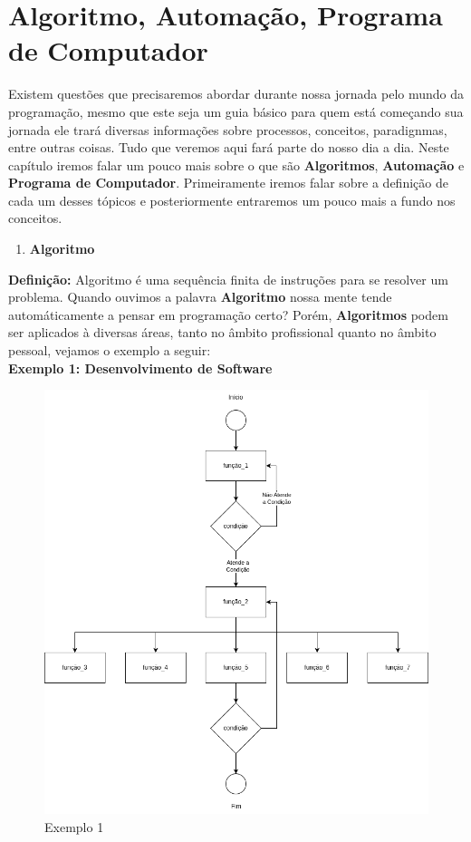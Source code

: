 \documentclass{report}
\begin{document}
\chapter{Algoritmo, Automação, Programa de Computador}
    Existem questões que precisaremos abordar durante nossa jornada pelo mundo da programação, mesmo que este seja um guia básico
    para quem está começando sua jornada ele trará diversas informações sobre processos, conceitos, paradignmas, entre outras coisas. Tudo que veremos
    aqui fará parte do nosso dia a dia. Neste capítulo iremos falar um pouco mais sobre o que são \textbf{Algoritmos}, \textbf{Automação} e 
    \textbf{Programa de Computador}. Primeiramente iremos falar sobre a definição de cada um desses tópicos e posteriormente entraremos um 
    pouco mais a fundo nos conceitos.\\
    \vspace{12pt}
    \begin{enumerate}
        \item \textbf{Algoritmo}
    \end{enumerate}
    \textbf{Definição:} Algoritmo é uma sequência finita de instruções para se resolver um problema. Quando ouvimos a palavra \textbf{Algoritmo} 
    nossa mente tende automáticamente a pensar em programação certo? Porém, \textbf{Algoritmos} podem ser aplicados à diversas áreas, 
    tanto no âmbito profissional quanto no âmbito pessoal, vejamos o exemplo a seguir:\\
    \vspace{12pt}
    \textbf{Exemplo 1: Desenvolvimento de Software}
    \begin{figure}[H]
        \centering
        \includegraphics[width=1.0\textwidth]{img/software.drawio.png}
        \caption{Exemplo 1}
        \label{fig:Exemplo 1}
    \end{figure}
\end{document}
